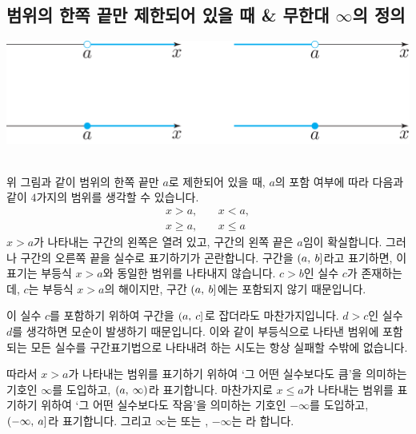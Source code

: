 \subsection{범위의 한쪽 끝만 제한되어 있을 때 \& 무한대 $\infty$의 정의}
\begin{center} \includegraphics[scale=\pgfkeysvalueof{picsize}]{DBs/pic/zero_13.pdf}\
	\end{center}위 그림과 같이 범위의 한쪽 끝만 $a$로 제한되어 있을 때, $a$의 포함 여부에 따라 다음과 같이 $4$가지의 범위를 생각할 수 있습니다. %
\begin{align*}
    x  >  a, \: && x < a, \\
    x \ge a, \: && x \le a
\end{align*}\clearpage
$x>a$가 나타내는 구간의 왼쪽은 열려 있고, 구간의 왼쪽 끝은 $a$임이 확실합니다. 그러나 구간의 오른쪽 끝을 실수로 표기하기가 곤란합니다. 구간을 $\left(a,\: b\right]$라고 표기하면, 이 표기는 부등식 $x>a$와 동일한 범위를 나타내지 않습니다. $c>b$인 실수 $c$가 존재하는데, $c$는 부등식 $x > a$의 해이지만, 구간 $\left(a,\: b\right]$에는 포함되지 않기 때문입니다.

이 실수 $c$를 포함하기 위하여 구간을 $\left(a,\: c\right]$로 잡더라도 마찬가지입니다. $d>c$인 실수 $d$를 생각하면 모순이 발생하기 때문입니다. 이와 같이 부등식으로 나타낸 범위에 포함되는 모든 실수를 구간표기법으로 나타내려 하는 시도는 항상 실패할 수밖에 없습니다.

따라서 $x>a$가 나타내는 범위를 표기하기 위하여 `그 어떤 실수보다도 큼'을 의미하는 기호인 $\infty$를 도입하고, $\left(a,\: \infty\right)$라 표기합니다. 마찬가지로 $x \le a$가 나타내는 범위를 표기하기 위하여 `그 어떤 실수보다도 작음'을 의미하는 기호인  $-\infty$를 도입하고, $\left(-\infty,\: a\right]$라 표기합니다. 그리고 $\infty$는  또는 , $-\infty$는 라 합니다.

